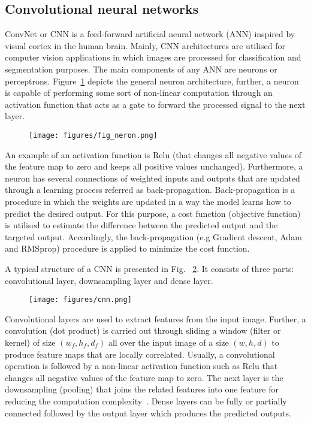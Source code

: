 \subsection{Convolutional neural networks}
ConvNet or CNN is a feed-forward artificial neural network (ANN) inspired by visual cortex in the human brain.
Mainly, CNN architectures are utilised for computer vision applications in which images are processed for classification and segmentation purposes.
The main components of any ANN are neurons or perceptrons.
Figure~\ref{fig:neuron} depicts the general neuron architecture, further, a neuron is capable of performing some sort of non-linear computation through an activation function that acts as a gate to forward the processed signal to the next layer.
\begin{figure}
	\begin{center}
		\texttt{[image: figures/fig\_neron.png]}
	\end{center}
	\label{fig:neuron}
\end{figure}
An example of an activation function is Relu (that changes all negative values of the feature map to zero and keeps all positive values unchanged).
Furthermore, a neuron has several connections of weighted inputs and outputs that are updated through a learning process referred as back-propagation. 
Back-propagation is a procedure in which the weights are updated in a way the model learns how to predict the desired output.
For this purpose, a cost function (objective function) is utilised to estimate the difference between the predicted output and the targeted output.
Accordingly, the back-propagation (e.g Gradient descent, Adam and RMSprop) procedure is applied to minimize the cost function.

A typical structure of a CNN is presented in Fig. ~\ref{CNN}. 
It consists of three parts: convolutional layer, downsampling layer and dense layer.
\begin{figure}
	\begin{center}
		\texttt{[image: figures/cnn.png]}
	\end{center}
	\label{CNN}
\end{figure}
Convolutional layers are used to extract features from the input image.
Further, a convolution (dot product) is carried out through sliding a window (filter or kernel) of size \((w_f,h_f,d_f)\) all over the input image of a size \((w,h,d)\)  to produce feature maps that are locally correlated.
Usually, a convolutional operation is followed by a non-linear activation function such as Relu that changes all negative values of the feature map to zero.
The next layer is the downsampling (pooling) that joins the related features into one feature for reducing the computation complexity~\cite{Lecun2015}. 
Dense layers can be fully or partially connected followed by the output layer which produces the predicted outputs. 
